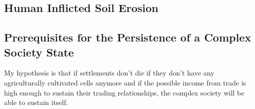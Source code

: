 \subsection{Human Inflicted Soil Erosion}

\subsection{Prerequisites for the Persistence of a Complex Society State}

My hypothesis is that if settlements don't die if they don't have any agriculturally cultivated cells anymore and if the possible income from trade is high enough to sustain their trading relationships, the complex society will be able to sustain itself.